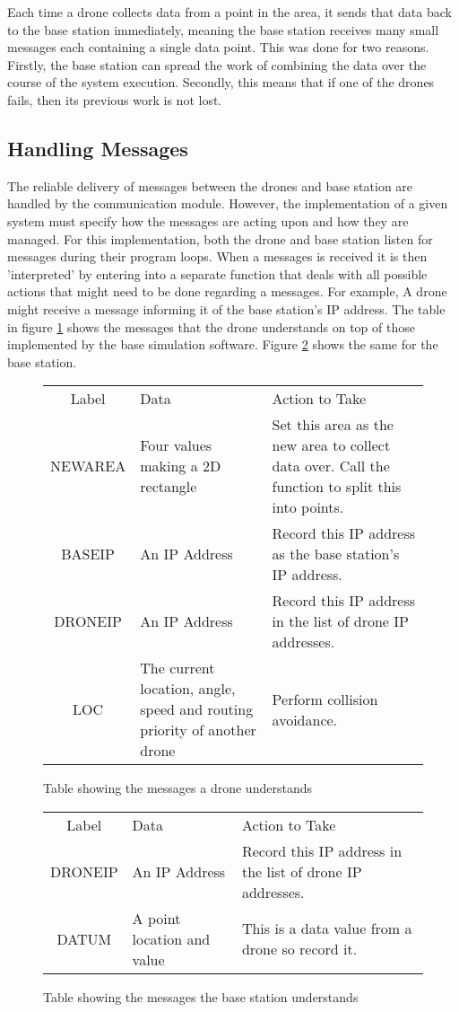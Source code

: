 Each time a drone collects data from a point in the area, it sends that data back to the base station immediately, meaning the base station receives many small messages each containing a single data point. This was done for two reasons. Firstly, the base station can spread the work of combining the data over the course of the system execution. Secondly, this means that if one of the drones fails, then its previous work is not lost.

\subsection{Handling Messages}

The reliable delivery of messages between the drones and base station are handled by the communication module. However, the implementation of a given system must specify how the messages are acting upon and how they are managed. For this implementation, both the drone and base station listen for messages during their program loops. When a messages is received it is then 'interpreted' by entering into a separate function that deals with all possible actions that might need to be done regarding a messages. For example, A drone might receive a message informing it of the base station's IP address. The table in figure \ref{tbl:messages_drone} shows the messages that the drone understands on top of those implemented by the base simulation software. Figure \ref{tbl:messages_basestation} shows the same for the base station.

\begin{figure}
\begin{tabular}{c|l|l}
Label & Data & Action to Take \\
NEWAREA	& Four values making a 2D rectangle	& Set this area as the new area to collect data over. Call the function to split this into points. \\
BASEIP & An IP Address & Record this IP address as the base station's IP address. \\
DRONEIP	& An IP Address	& Record this IP address in the list of drone IP addresses. \\
LOC	& The current location, angle, speed and routing priority of another drone & Perform collision avoidance. \\
\end{tabular}
\caption{Table showing the messages a drone understands}
\label{tbl:messages_drone}
\end{figure}

\begin{figure}
\begin{tabular}{c|l|l}
Label	& Data							& Action to Take	\\
DRONEIP	& An IP Address					& Record this IP address in the list of drone IP addresses. \\
DATUM	& A point location and value	& This is a data value from a drone so record it.
\end{tabular}
\caption{Table showing the messages the base station understands}
\label{tbl:messages_basestation}
\end{figure}

